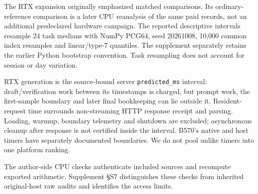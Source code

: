 The RTX expansion originally emphasized matched comparisons. Its ordinary-reference comparison is a later CPU reanalysis of the same paid records, not an additional predeclared hardware campaign. The reported descriptive intervals resample 24 task medians with NumPy PCG64, seed 20261008, 10,000 common index resamples and linear/type-7 quantiles. The supplement separately retains the earlier Python bootstrap convention. Task resampling does not account for session or day variation.

RTX generation is the source-bound server \texttt{predicted\_ms} interval: draft/verification work between its timestamps is charged, but prompt work, the first-sample boundary and later final bookkeeping can lie outside it. Resident-request time surrounds non-streaming HTTP response receipt and parsing. Loading, warmup, boundary telemetry and shutdown are excluded; asynchronous cleanup after response is not certified inside the interval. B570's native and host timers have separately documented boundaries. We do not pool unlike timers into one platform ranking.

The author-side CPU checks authenticate included sources and recompute exported arithmetic. Supplement \S S7 distinguishes these checks from inherited original-host raw audits and identifies the access limits.
